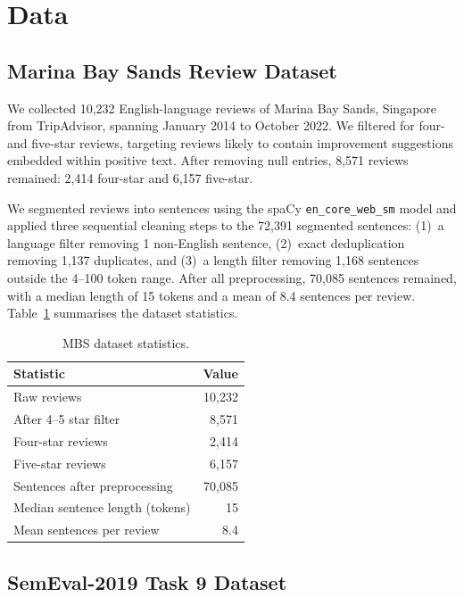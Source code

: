 \section{Data}

\subsection{Marina Bay Sands Review Dataset}

We collected 10,232 English-language reviews of Marina Bay
Sands, Singapore from TripAdvisor, spanning January 2014 to
October 2022. We filtered for four- and five-star reviews, targeting
reviews likely to contain improvement suggestions embedded within
positive text. After removing null entries, 8,571
reviews remained: 2,414 four-star and 6,157 five-star.

We segmented reviews into sentences using the spaCy
\texttt{en\_core\_web\_sm} model \citep{honnibal2020spacy} and
applied three sequential cleaning steps to the 72,391 segmented
sentences: (1)~a language filter removing 1 non-English sentence,
(2)~exact deduplication removing 1,137 duplicates, and (3)~a
length filter removing 1,168 sentences outside the 4--100 token
range. After all preprocessing, 70,085
sentences remained, with a median length of 15 tokens and a mean
of 8.4 sentences per review. Table~\ref{tab:mbs-stats}
summarises the dataset statistics.

\begin{table}[t]
\centering\small
\caption{MBS dataset statistics.}
\label{tab:mbs-stats}
\begin{tabular}{lr}
\toprule
\textbf{Statistic} & \textbf{Value} \\
\midrule
Raw reviews            & 10,232 \\
After 4--5 star filter & 8,571  \\
Four-star reviews      & 2,414  \\
Five-star reviews      & 6,157  \\
Sentences after preprocessing & 70,085 \\
Median sentence length (tokens) & 15 \\
Mean sentences per review & 8.4 \\
\bottomrule
\end{tabular}
\end{table}

\subsection{SemEval-2019 Task 9 Dataset}

